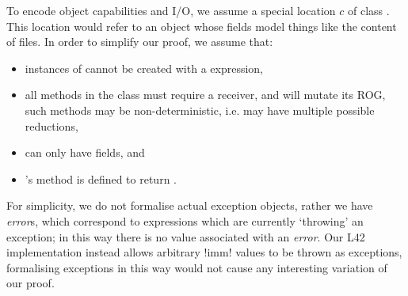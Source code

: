 \noindent To encode object capabilities and I/O, we assume a special location  $c$ of class \Q@Cap@. This location would refer to an object whose fields model things like the content of files. In order to simplify our proof, we assume that:
\begin{itemize}
	\item instances of \Q@Cap@ cannot be created with a \Q@new@ expression,
	\item all methods in the \Q@Cap@ class must require a \Q@mut@ receiver, and will mutate its ROG, such methods may be non-deterministic, i.e. may have multiple possible reductions,
	\item \Q@Cap@ can only have \Q@mut@ fields, and
	\item \Q@Cap@'s \Q@invariant@ method is defined to return \Q@true@.
\end{itemize}
For simplicity, we do not formalise actual exception objects, rather we have \emph{error}s, which correspond to expressions which are currently  `throwing' an exception; 
in this way there is no value associated with an \emph{error}.
Our L42 implementation instead allows arbitrary \Q!imm! values to be thrown as exceptions, formalising exceptions in this way would not cause any interesting variation of our proof.

